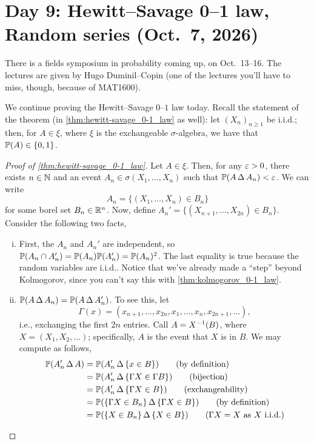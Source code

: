 \section{Day 9: Hewitt--Savage 0--1 law, Random series (Oct.\ 7, 2026)}
There is a fields symposium in probability coming up, on Oct.\ 13--16. The lectures are given by Hugo Duminil--Copin (one of the lectures you'll have to miss, though, because of MAT1600).

We continue proving the Hewitt--Savage $0$--$1$ law today. Recall the statement of the theorem (in \ref{thm:hewitt-savage_0-1_law} as well): let $(X_n)_{n \geq 1}$ be i.i.d.; then, for $A \in \xi$, where $\xi$ is the exchangeable $\sigma$-algebra, we have that $\mathbb P(A) \in \{0, 1\}$.
\begin{proof}[Proof of \ref{thm:hewitt-savage_0-1_law}]
    Let $A \in \xi$. Then, for any $\varepsilon > 0$, there exists $n \in \mathbb N$ and an event $A_n \in \sigma(X_1, \dots, X_n)$ such that $\mathbb P(A \,\Delta\, A_n) < \varepsilon$. We can write
    \[ A_n = \{(X_1, \dots, X_n) \in B_n\} \]
    for some borel set $B_n \in \mathbb R^n$. Now, define $A_n' = \{(X_{n+1}, \dots, X_{2n}) \in B_n\}$. Consider the following two facts, 
    \begin{enumerate}[(i)]
        \item First, the $A_n$ and $A_n'$ are independent, so $\mathbb P(A_n \cap A_n') = \mathbb P(A_n) \mathbb P(A_n') = \mathbb P(A_n)^2$. The last equality is true because the random variables are i.i.d.. Notice that we've already made a ``step'' beyond Kolmogorov, since you can't say this with \ref{thm:kolmogorov_0-1_law}.
        \item $\mathbb P(A \, \Delta \, A_n) = \mathbb P(A \, \Delta \, A_n')$. To see this, let
        \[ \Gamma(x) = (x_{n+1}, \dots, x_{2n}, x_1, \dots, x_n, x_{2n+1}, \dots), \]
        i.e., exchanging the first $2n$ entries. Call $A = X^{-1}(B)$, where $X = (X_1, X_2, \dots)$; specifically, $A$ is the event that $X$ is in $B$. We may compute as follows,
        \begin{align*}
            \PP(A_n' \, \Delta \, A) &= \PP(A_n' \, \Delta \, \{x \in B\}) \tag{by definition} \\
            &= \PP(A_n' \, \Delta \, \{\Gamma X \in \Gamma B\}) \tag{bijection} \\
            &= \PP(A_n' \, \Delta \, \{\Gamma X \in B\}) \tag{exchangeability} \\
            &= \PP(\{\Gamma X \in B_n\} \, \Delta \, \{\Gamma X \in B\}) \tag{by definition} \\
            &= \PP(\{X \in B_n\} \, \Delta \, \{X \in B\}) \tag{$\Gamma X = X$ as $X$ i.i.d.} \\

\end{align*}
\end{enumerate}
\end{proof}
